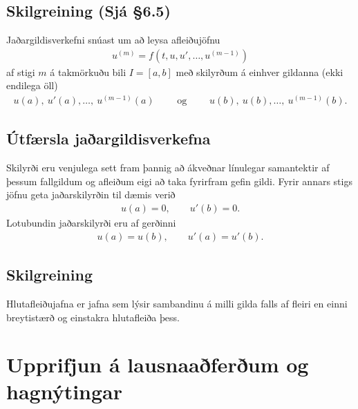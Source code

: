 \documentclass[a4paper,10pt,icelandic]{sphinxmanual}
\begin{document}
\subsection{Skilgreining (Sjá \S{}6.5)}
\label{\detokenize{Kafli06:skilgreining-sja-6-5}}
Jaðargildisverkefni snúast um að leysa afleiðujöfnu
\begin{equation*}
\begin{split}u^{(m)}=f(t,u,u',\dots,u^{(m-1)})\end{split}
\end{equation*}
af stigi \(m\) á takmörkuðu bili \(I=[a,b]\) með skilyrðum á einhver gildanna (ekki endilega öll)
\begin{equation*}
\begin{split}u(a), \ u'(a),\dots,  \ u^{(m-1)}(a)\qquad \text{ og }
\qquad  u(b), \ u(b),\dots, \ u^{(m-1)}(b).\end{split}
\end{equation*}

\subsection{Útfærsla jaðargildisverkefna}
\label{\detokenize{Kafli06:utfaersla-jaargildisverkefna}}
Skilyrði eru venjulega sett fram þannig að ákveðnar línulegar samantektir af þessum fallgildum og afleiðum eigi að taka fyrirfram gefin gildi. Fyrir annars stigs jöfnu geta jaðarskilyrðin til dæmis verið
\begin{equation*}
\begin{split}u(a)=0, \qquad u'(b)=0.\end{split}
\end{equation*}
Lotubundin jaðarskilyrði eru af gerðinni
\begin{equation*}
\begin{split}u(a)=u(b), \qquad u'(a)=u'(b).\end{split}
\end{equation*}

\subsection{Skilgreining}
\label{\detokenize{Kafli06:skilgreining}}
Hlutafleiðujafna er jafna sem lýsir sambandinu á milli gilda falls af fleiri en einni breytistærð og einstakra hlutafleiða þess.


\section{Upprifjun á lausnaaðferðum og hagnýtingar}
\label{\detokenize{Kafli06:upprifjun-a-lausnaaferum-og-hagnytingar}}
\end{document}
